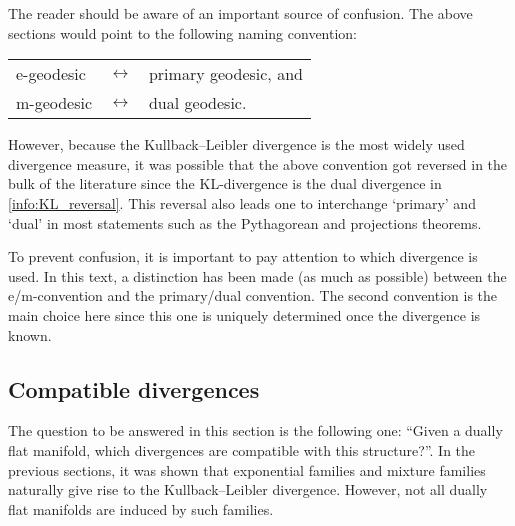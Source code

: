     \begin{remark}
        The reader should be aware of an important source of confusion. The above sections would point to the following naming convention:
        \begin{center}
            \begin{tabular}{lll}
                e-geodesic&$\leftrightarrow$&primary geodesic, and\\
                m-geodesic&$\leftrightarrow$&dual geodesic.
            \end{tabular}
        \end{center}
        However, because the Kullback--Leibler divergence is the most widely used divergence measure, it was possible that the above convention got reversed in the bulk of the literature since the KL-divergence is the dual divergence in \cref{info:KL_reversal}. This reversal also leads one to interchange `primary' and `dual' in most statements such as the Pythagorean and projections theorems.

        To prevent confusion, it is important to pay attention to which divergence is used. In this text, a distinction has been made (as much as possible) between the e/m-convention and the primary/dual convention. The second convention is the main choice here since this one is uniquely determined once the divergence is known.
    \end{remark}

\subsection{Compatible divergences}

    The question to be answered in this section is the following one: ``Given a dually flat manifold, which divergences are compatible with this structure?''. In the previous sections, it was shown that exponential families and mixture families naturally give rise to the Kullback--Leibler divergence. However, not all dually flat manifolds are induced by such families.

